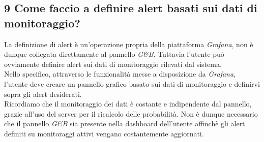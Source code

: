 \subsection*{9 Come faccio a definire alert basati sui dati di monitoraggio?}
La definizione di alert è un'operazione propria della piattaforma \textit{Grafana}, non è dunque collegata direttamente al pannello \textit{G\&B}. Tuttavia l'utente può ovviamente definire alert sui dati di monitoraggio rilevati dal sistema.\\
Nello specifico, attraverso le funzionalità messe a disposizione da \textit{Grafana}, l'utente deve creare un pannello grafico basato sui dati di monitoraggio e definirvi sopra gli alert desiderati.\\
Ricordiamo che il monitoraggio dei dati è costante e indipendente dal pannello, grazie all'uso del server per il ricalcolo delle probabilità. Non è dunque necessario che il pannello \textit{G\&B} sia presente nella dashboard dell'utente affinchè gli alert definiti su monitoraggi attivi vengano costantemente aggiornati.


